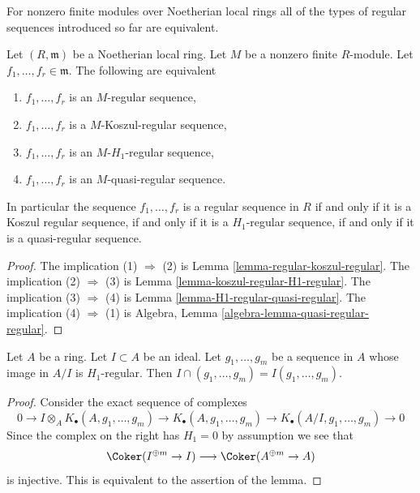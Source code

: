 \noindent
For nonzero finite modules over Noetherian local rings all of the types of
regular sequences introduced so far are equivalent.

\begin{lemma}
\label{lemma-noetherian-finite-all-equivalent}
Let $(R, \mathfrak m)$ be a Noetherian local ring. Let $M$ be a nonzero
finite $R$-module. Let $f_1, \ldots, f_r \in \mathfrak m$. The following
are equivalent
\begin{enumerate}
\item $f_1, \ldots, f_r$ is an $M$-regular sequence,
\item $f_1, \ldots, f_r$ is a $M$-Koszul-regular sequence,
\item $f_1, \ldots, f_r$ is an $M$-$H_1$-regular sequence,
\item $f_1, \ldots, f_r$ is an $M$-quasi-regular sequence.
\end{enumerate}
In particular the sequence $f_1, \ldots, f_r$ is a regular sequence
in $R$ if and only if it is a Koszul regular sequence, if and only if
it is a $H_1$-regular sequence, if and only if it is a quasi-regular sequence.
\end{lemma}

\begin{proof}
The implication (1) $\Rightarrow$ (2) is 
Lemma \ref{lemma-regular-koszul-regular}.
The implication (2) $\Rightarrow$ (3) is
Lemma \ref{lemma-koszul-regular-H1-regular}.
The implication (3) $\Rightarrow$ (4) is 
Lemma \ref{lemma-H1-regular-quasi-regular}.
The implication (4) $\Rightarrow$ (1) is
Algebra, Lemma \ref{algebra-lemma-quasi-regular-regular}.
\end{proof}

\begin{lemma}
\label{lemma-H1-regular-in-quotient}
Let $A$ be a ring. Let $I \subset A$ be an ideal.
Let $g_1, \ldots, g_m$ be a sequence in $A$ whose image in
$A/I$ is $H_1$-regular. Then $I \cap (g_1, \ldots, g_m) =
I(g_1, \ldots, g_m)$.
\end{lemma}

\begin{proof}
Consider the exact sequence of complexes
$$
0 \to I \otimes_A K_\bullet(A, g_1, \ldots, g_m)
\to K_\bullet(A, g_1, \ldots, g_m) \to
K_\bullet(A/I, g_1, \ldots, g_m) \to 0
$$
Since the complex on the right has $H_1 = 0$ by assumption we
see that
$$
\Coker(I^{\oplus m} \to I)
\longrightarrow
\Coker(A^{\oplus m} \to A)
$$
is injective. This is equivalent to the assertion of the lemma.
\end{proof}

